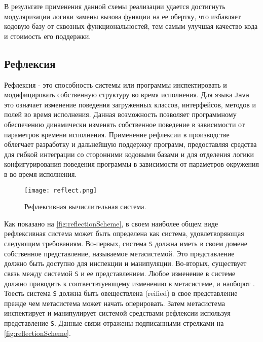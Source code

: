 В результате применения данной схемы реализации удается достигнуть модуляризации логики замены вызова функции на ее обертку, что избавляет кодовую базу от сквозных функциональностей, тем самым улучшая качество кода и стоимость его поддержки.

\subsection{Рефлексия}

Рефлексия - это способность системы или программы инспектировать и модифицировать собственную структуру во время исполнения. Для языка \texttt{Java} это означает изменение поведения загруженных классов, интерфейсов, методов и полей во время исполнения. Данная возможность позволяет программному обеспечению динамически изменять собственное поведение в зависимости от параметров времени исполнения. Применение рефлексии в производстве облегчает разработку и дальнейшую поддержку программ, предоставляя средства для гибкой интеграции со сторонними кодовыми базами и для отделения логики конфигурирования поведения программы в зависимости от параметров окружения в во время исполнения.

\begin{figure}[h]
\centering
\texttt{[image: reflect.png]}
\caption{Рефлексивная вычислительная система.}
\label{fig:reflectionScheme}
\end{figure}

Как показано на \autoref{fig:reflectionScheme}, в своем наиболее общем виде рефлексивная система может быть определена как система, удовлетворяющая следующим требованиям. Во-первых, система \texttt{S} должна иметь в своем домене собственное представление, называемое метасистемой. Это представление должно быть доступно для инспекции и манипуляции. Во-вторых, существует связь между системой \texttt{S} и ее представлением. Любое изменение в системе должно приводить к соотвествтуеющему изменению в метасистеме, и наоборот \cite{javaReflection}. Тоесть система \texttt{S} должна быть овеществлена (reified) в свое представление прежде чем метасистема может начать оперировать. Затем метасистема инспектирует и манипулирует системой средствами рефлексии используя представление \texttt{S}. Данные связи отражены подписанными стрелками на \autoref{fig:reflectionScheme}.

